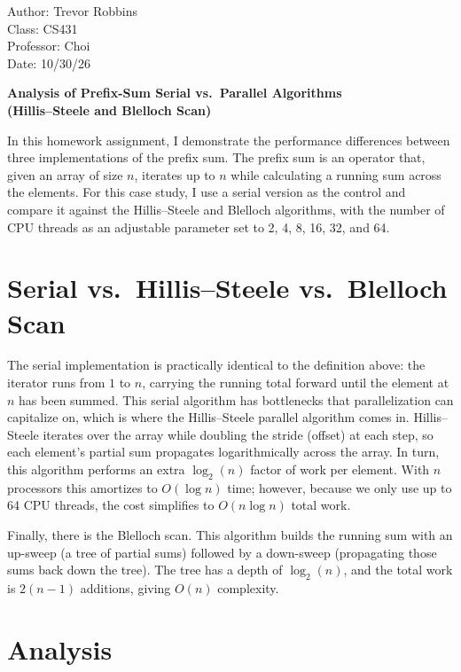 \documentclass[11pt,letterpaper]{article}
\begin{document}
\noindent
Author: Trevor Robbins\\
Class: CS431\\
Professor: Choi\\
Date: 10/30/26

\begin{center}
  {\large\bfseries Analysis of Prefix-Sum Serial vs.\ Parallel Algorithms\\
  (Hillis--Steele and Blelloch Scan)}
\end{center}

\onehalfspacing

In this homework assignment, I demonstrate the performance differences between
three implementations of the prefix sum. The prefix sum is an operator that,
given an array of size $n$, iterates up to $n$ while calculating a running sum
across the elements. For this case study, I use a serial version as the control
and compare it against the Hillis--Steele and Blelloch algorithms, with the
number of CPU threads as an adjustable parameter set to 2, 4, 8, 16, 32, and 64.

\section*{Serial vs.\ Hillis--Steele vs.\ Blelloch Scan}

The serial implementation is practically identical to the definition above: the
iterator runs from $1$ to $n$, carrying the running total forward until the
element at $n$ has been summed. This serial algorithm has bottlenecks that
parallelization can capitalize on, which is where the Hillis--Steele parallel
algorithm comes in. Hillis--Steele iterates over the array while doubling the
stride (offset) at each step, so each element's partial sum propagates
logarithmically across the array. In turn, this algorithm performs an extra
$\log_2(n)$ factor of work per element. With $n$ processors this amortizes to
$O(\log n)$ time; however, because we only use up to 64 CPU threads, the cost
simplifies to $O(n \log n)$ total work.

Finally, there is the Blelloch scan. This algorithm builds the running sum with
an up-sweep (a tree of partial sums) followed by a down-sweep (propagating those
sums back down the tree). The tree has a depth of $\log_2(n)$, and the total
work is $2(n-1)$ additions, giving $O(n)$ complexity.

\section*{Analysis}
\end{document}
